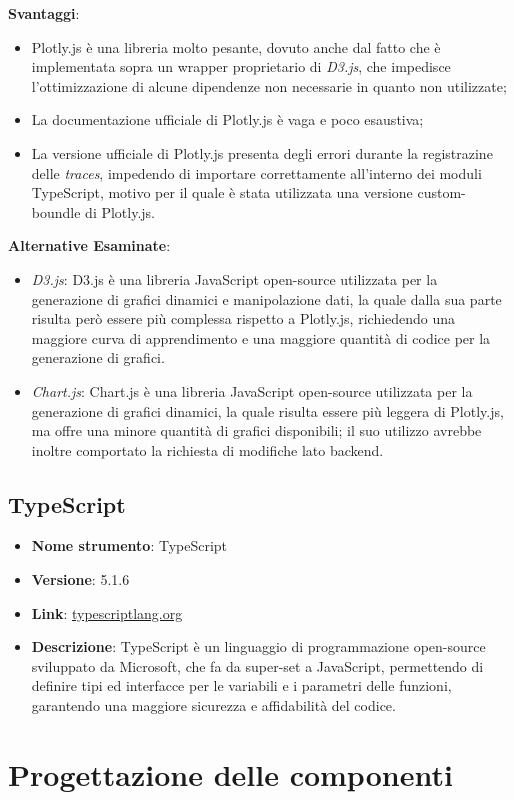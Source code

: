 \item \textbf{Svantaggi}:
\begin{itemize}
      \item Plotly.js è una libreria molto pesante, dovuto anche dal fatto che è implementata sopra un wrapper proprietario di \textit{D3.js},
            che impedisce l'ottimizzazione di alcune dipendenze non necessarie in quanto non utilizzate;
      \item La documentazione ufficiale di Plotly.js è vaga e poco esaustiva;
      \item La versione ufficiale di Plotly.js presenta degli errori durante la registrazine delle \textit{traces}, impedendo di importare correttamente
             all'interno dei moduli TypeScript, motivo per il quale è stata utilizzata una versione custom-boundle di Plotly.js.
\end{itemize}
\item \textbf{Alternative Esaminate}:
\begin{itemize}
      \item \textit{D3.js}: D3.js è una libreria JavaScript open-source utilizzata per la generazione di grafici dinamici e manipolazione dati, la quale dalla sua parte risulta però
            essere più complessa rispetto a Plotly.js, richiedendo una maggiore curva di apprendimento e una maggiore quantità di codice per la generazione di grafici.
      \item \textit{Chart.js}: Chart.js è una libreria JavaScript open-source utilizzata per la generazione di grafici dinamici, la quale risulta essere più leggera di Plotly.js,
            ma offre una minore quantità di grafici disponibili; il suo utilizzo avrebbe inoltre comportato la richiesta di modifiche lato backend.
\end{itemize}


\subsection{TypeScript}
\begin{itemize}
      \item \textbf{Nome strumento}: TypeScript
      \item \textbf{Versione}: 5.1.6
      \item \textbf{Link}: \href{https://www.typescriptlang.org/}{typescriptlang.org}
      \item \textbf{Descrizione}: TypeScript è un linguaggio di programmazione open-source sviluppato da Microsoft, che fa da super-set a JavaScript,
            permettendo di definire tipi ed interfacce per le variabili e i parametri delle funzioni, garantendo una maggiore sicurezza e affidabilità del codice.
\end{itemize}

\section{Progettazione delle componenti}

